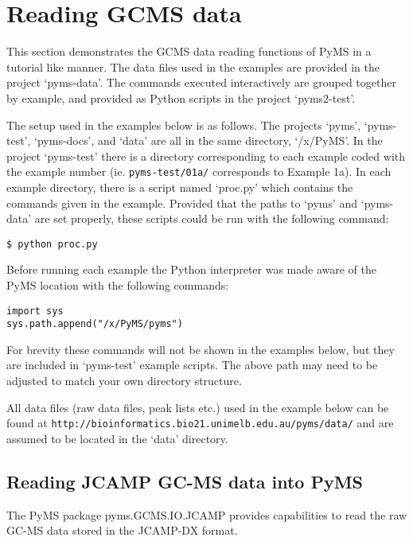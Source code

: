 \section{Reading GCMS data}

This section demonstrates the GCMS data reading functions of PyMS in a tutorial
like manner. The data files used in the examples are provided in the project
`pyms-data'. The commands executed interactively are grouped together by
example, and provided as Python scripts in the project `pyms2-test'.

The setup used in the examples below is as follows. The projects `pyms',
`pyms-test', `pyms-docs', and `data' are all in the same directory,
`/x/PyMS'. In the project `pyms-test' there is a directory corresponding to
each example coded with the example number (ie. {\tt pyms-test/01a/}
corresponds to Example 1a). In each example directory, there is a script named
`proc.py' which contains the commands given in the example. Provided that the
paths to `pyms' and `pyms-data' are set properly, these scripts could be run
with the following command:

\begin{verbatim}
$ python proc.py
\end{verbatim}

Before running each example the Python interpreter was made aware of the
PyMS location with the following commands:

\begin{verbatim}
import sys
sys.path.append("/x/PyMS/pyms")
\end{verbatim}

For brevity these commands will not be shown in the examples below, but
they are included in `pyms-test' example scripts.  The above path may need
to be adjusted to match your own directory structure.

All data files (raw data files, peak lists etc.) used in the example below
can be found at {\tt http://bioinformatics.bio21.unimelb.edu.au/pyms/data/} and
are assumed to be located in the `data' directory.

\subsection{Reading JCAMP GC-MS data into PyMS}


The PyMS package pyms.GCMS.IO.JCAMP provides capabilities to read the raw
GC-MS data stored in the JCAMP-DX format.

